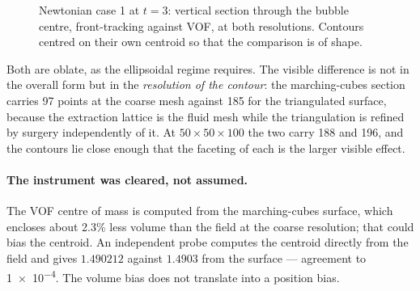 \begin{figure}[htbp]
\centering
{}\hfill
{}
\caption{Newtonian case 1 at $t=3$: vertical section through the bubble centre,
front-tracking against VOF, at both resolutions. Contours centred on their own
centroid so that the comparison is of shape.}
\label{fig:newtshape}
\end{figure}

Both are oblate, as the ellipsoidal regime requires. The visible difference is
not in the overall form but in the \emph{resolution of the contour}: the
marching-cubes section carries 97 points at the coarse mesh against 185 for the
triangulated surface, because the extraction lattice is the fluid mesh while the
triangulation is refined by surgery independently of it. At
$50\times50\times100$ the two carry 188 and 196, and the contours lie close
enough that the faceting of each is the larger visible effect.

\paragraph{The instrument was cleared, not assumed.}
The VOF centre of mass is computed from the marching-cubes surface, which
encloses about 2.3\% less volume than the field at the coarse resolution; that
could bias the centroid. An independent probe computes the centroid directly
from the field and gives $1.490212$ against $1.4903$ from the surface ---
agreement to \num{1e-4}. The volume bias does not translate into a position
bias.

